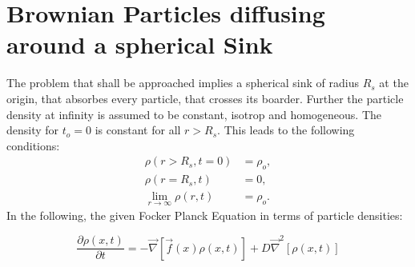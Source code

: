 \section{Brownian Particles diffusing around a spherical Sink}

The problem that shall be approached implies a spherical sink of radius $R_s$ at the origin, that absorbes every particle, that crosses its boarder. Further the particle density at infinity is assumed to be constant, isotrop and homogeneous. The density for $t_o = 0$ is constant for all $r > R_s$. 
This leads to the following conditions:
\begin{align}
    \rho(r > R_s, t = 0) &= \rho_o, \\
    \rho(r=R_s,t) &= 0, \\
    \lim_{r \rightarrow \infty} \rho(r, t) &= \rho_o.
    \label{BC}
\end{align}
In the following, the given Focker Planck Equation in terms of particle densities:

\begin{equation}
        \frac{\partial \rho(x,t)}{\partial t} = - \vec \nabla \left[ \vec f(x)\rho(x,t) \right] + D\vec \nabla ^2 \left[\rho(x,t) \right] 
    \label{FPE3}
\end{equation}


